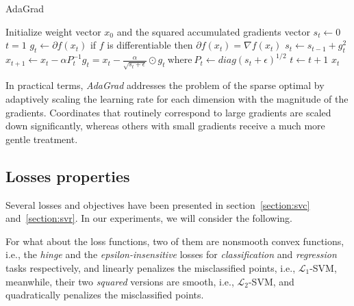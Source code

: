 \begin{algorithm}[H]
	\caption{AdaGrad}
	\label{alg:adagrad}
	\begin{algorithmic}
			\State Initialize weight vector $x_0$ and the squared accumulated gradients vector $s_t \gets 0$
			\State $t = 1$
				\State $g_t \gets \partial f(x_t)$ \Comment if $f$ is differentiable then $\partial f(x_t) = \nabla f(x_t)$
				\State $s_t \gets s_{t-1} + g_t^2$
				\State $x_{t+1} \gets x_t - \alpha P_t^{-1} g_t = x_t - \displaystyle \frac{\alpha}{\sqrt{s_t + \epsilon}} \odot g_t \ \text{where} \ P_t \gets diag(s_t + \epsilon)^{1/2}$
				\State $t \gets t + 1$
			\EndWhile
			\State \Return $x_t$
		\EndFunction
	\end{algorithmic}
\end{algorithm}

In practical terms, \emph{AdaGrad} addresses the problem of the sparse optimal by adaptively scaling the learning rate for each dimension with the magnitude of the gradients. Coordinates that routinely correspond to large gradients are scaled down significantly, whereas others with small gradients receive a much more gentle treatment.

\pagebreak

\subsection{Losses properties}

Several losses and objectives have been presented in section~\ref{section:svc} and~\ref{section:svr}. In our experiments, we will consider the following.

For what about the loss functions, two of them are nonsmooth convex functions, i.e., the \emph{hinge} and the \emph{epsilon-insensitive} losses for \emph{classification} and \emph{regression} tasks respectively, and linearly penalizes the misclassified points, i.e., $\mathcal{L}_1$-SVM, meanwhile, their two \emph{squared} versions are smooth, i.e., $\mathcal{L}_2$-SVM, and quadratically penalizes the misclassified points.


